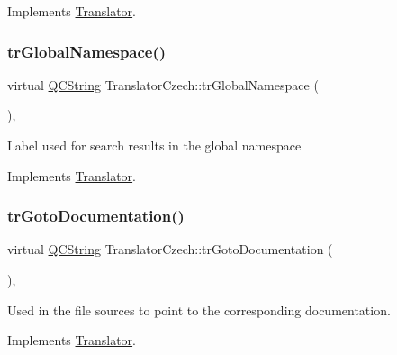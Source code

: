 Implements \mbox{\hyperlink{class_translator}{Translator}}.

\mbox{\label{class_translator_czech_a654d86b073aa580dfd0bdcc27cadff56}} 
\subsubsection{\texorpdfstring{trGlobalNamespace()}{trGlobalNamespace()}}
{\footnotesize\ttfamily virtual \mbox{\hyperlink{class_q_c_string}{Q\+C\+String}} Translator\+Czech\+::tr\+Global\+Namespace (\begin{DoxyParamCaption}{ }\end{DoxyParamCaption})\hspace{0.3cm}{\ttfamily [inline]}, {\ttfamily [virtual]}}

Label used for search results in the global namespace 

Implements \mbox{\hyperlink{class_translator}{Translator}}.

\mbox{\label{class_translator_czech_a023255d64d137b90bc2be66ade101d1e}} 
\subsubsection{\texorpdfstring{trGotoDocumentation()}{trGotoDocumentation()}}
{\footnotesize\ttfamily virtual \mbox{\hyperlink{class_q_c_string}{Q\+C\+String}} Translator\+Czech\+::tr\+Goto\+Documentation (\begin{DoxyParamCaption}{ }\end{DoxyParamCaption})\hspace{0.3cm}{\ttfamily [inline]}, {\ttfamily [virtual]}}

Used in the file sources to point to the corresponding documentation. 

Implements \mbox{\hyperlink{class_translator}{Translator}}.

\mbox{\label{class_translator_czech_aa23eb58726c11b307fea1bc41e25fa05}} 
